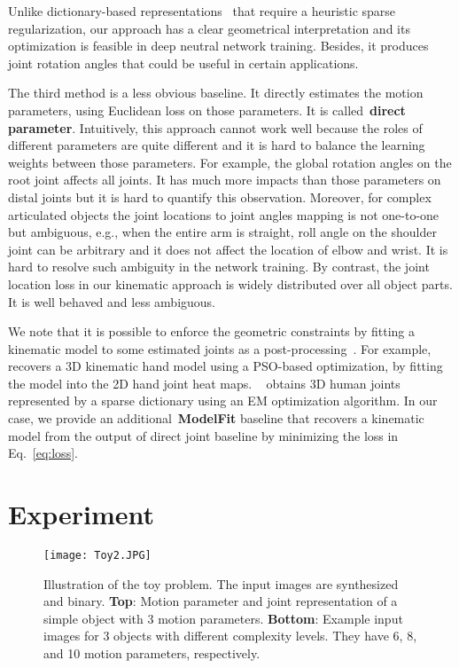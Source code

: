 \documentclass[runningheads]{llncs}
\begin{document}
Unlike dictionary-based representations~\cite{Wang_2014_CVPR,Zhou_2015_CVPR} that require a heuristic sparse regularization, our approach has a clear geometrical interpretation and its optimization is feasible in deep neutral network training. Besides, it produces joint rotation angles that could be useful in certain applications.


The third method is a less obvious baseline. It directly estimates the motion parameters, using Euclidean loss on those parameters. It is called~\textbf{direct parameter}. Intuitively, this approach cannot work well because the roles of different parameters are quite different and it is hard to balance the learning weights between those parameters. For example, the global rotation angles on the root joint affects all joints. It has much more impacts than those parameters on distal joints but it is hard to quantify this observation. Moreover, for complex articulated objects the joint locations to joint angles mapping is not one-to-one but ambiguous, e.g., when the entire arm is straight, roll angle on the shoulder joint can be arbitrary and it does not affect the location of elbow and wrist. It is hard to resolve such ambiguity in the network training. By contrast, the joint location loss in our kinematic approach is widely distributed over all object parts. It is well behaved and less ambiguous.

We note that it is possible to enforce the geometric constraints by fitting a kinematic model to some estimated joints as a post-processing~\cite{tompson14tog,Zhou_2016_CVPR}. For example, ~\cite{tompson14tog} recovers a 3D kinematic hand model using a PSO-based optimization, by fitting the model into the 2D hand joint heat maps. ~\cite{Zhou_2016_CVPR} obtains 3D human joints represented by a sparse dictionary using an EM optimization algorithm. In our case, we provide an additional~\textbf{ModelFit} baseline that recovers a kinematic model from the output of direct joint baseline by minimizing the loss in Eq.~\ref{eq:loss}.


\section{Experiment}

\begin{figure}
\begin{center}
\texttt{[image: Toy2.JPG]}
\end{center}
   \caption{Illustration of the toy problem. The input images are synthesized and binary. \textbf{Top}: Motion parameter and joint representation of a simple object with 3 motion parameters. \textbf{Bottom}: Example input images for 3 objects with different complexity levels. They have 6, 8, and 10 motion parameters, respectively.}
\label{fig:toy}
\end{figure}
\end{document}

